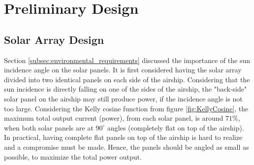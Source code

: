 \section{Preliminary Design}
\label{sec:preliminary_design}
%
\subsection{Solar Array Design}
%
Section \ref{subsec:environmental_requirements} discussed the importance of the sun incidence angle on the solar panels. It is first considered having the solar array divided into two identical panels on each side of the airship. Considering that the sun incidence is directly falling on one of the sides of the airship, the "back-side" solar panel on the airship may still produce power, if the incidence angle is not too large. Considering the Kelly cosine function from figure \ref{fig:KellyCosine}, the maximum total output current (power), from each solar panel, is around $71\%$, when both solar panels are at $90^{\circ}$ angles (completely flat on top of the airship). In practical, having complete flat panels on top of the airship is hard to realize and a compromise must be made. Hence, the panels should be angled as small as possible, to maximize the total power output.

